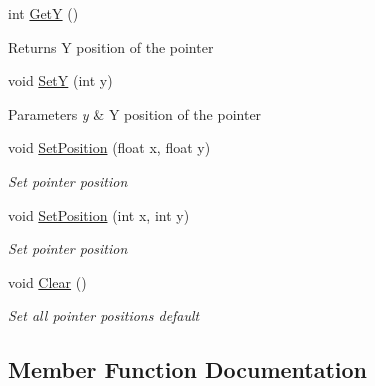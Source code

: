 \begin{DoxyCompactItemize}
int \mbox{\hyperlink{class_space_v_i_l_1_1_core_1_1_pointer_a76b0864f2f94b1ddf4275f89867c2373}{GetY}} ()
\begin{DoxyCompactList}\small\item\em \begin{DoxyReturn}{Returns}
Y position of the pointer 
\end{DoxyReturn}
\end{DoxyCompactList}\item 
\mbox{\label{class_space_v_i_l_1_1_core_1_1_pointer_a60d02cd0c088129a408bf625578f4931}} 
void \mbox{\hyperlink{class_space_v_i_l_1_1_core_1_1_pointer_a60d02cd0c088129a408bf625578f4931}{SetY}} (int y)
\begin{DoxyCompactList}\small\item\em 
\begin{DoxyParams}{Parameters}
{\em y} & Y position of the pointer \\
\hline
\end{DoxyParams}
\end{DoxyCompactList}\item 
void \mbox{\hyperlink{class_space_v_i_l_1_1_core_1_1_pointer_a8bb785976ab94d33b3db4698513fa608}{Set\+Position}} (float x, float y)
\begin{DoxyCompactList}\small\item\em Set pointer position \end{DoxyCompactList}\item 
void \mbox{\hyperlink{class_space_v_i_l_1_1_core_1_1_pointer_a22add8b2868fcbf998e5b65b264e4761}{Set\+Position}} (int x, int y)
\begin{DoxyCompactList}\small\item\em Set pointer position \end{DoxyCompactList}\item 
void \mbox{\hyperlink{class_space_v_i_l_1_1_core_1_1_pointer_a4dd8583d6cc63843032fb676757d63e2}{Clear}} ()
\begin{DoxyCompactList}\small\item\em Set all pointer positions default \end{DoxyCompactList}\end{DoxyCompactItemize}


\subsection{Member Function Documentation}
\mbox{\label{class_space_v_i_l_1_1_core_1_1_pointer_a4dd8583d6cc63843032fb676757d63e2}} 
